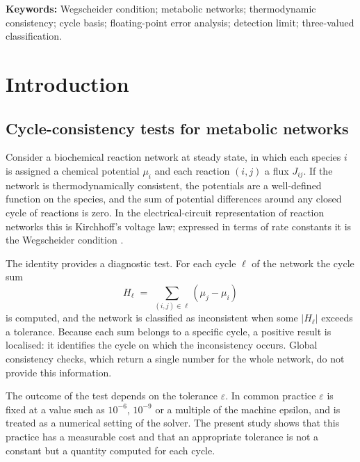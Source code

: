 \documentclass[11pt,a4paper]{article}
\theoremstyle{pstyle}
\theoremstyle{definition}
\theoremstyle{remark}
\newcommand{\abs}[1]{\lvert#1\rvert}
\newcommand{\eps}{\varepsilon}
\newcommand{\hol}{H}
\begin{document}
\noindent\textbf{Keywords:} Wegscheider condition; metabolic networks;
thermodynamic consistency; cycle basis; floating-point error analysis;
detection limit; three-valued classification.


\section{Introduction}
\label{sec:intro}

\subsection{Cycle-consistency tests for metabolic networks}

Consider a biochemical reaction network at steady state, in which each
species $i$ is assigned a chemical potential $\mu_i$ and each reaction
$(i,j)$ a flux $J_{ij}$. If the network is thermodynamically consistent,
the potentials are a well-defined function on the species, and the sum
of potential differences around any closed cycle of reactions is zero.
In the electrical-circuit representation of reaction networks
\citep{oster1971,peusner1986} this is Kirchhoff's voltage law; expressed
in terms of rate constants it is the Wegscheider condition
\citep{wegscheider1901,schuster1989}.

The identity provides a diagnostic test. For each cycle $\ell$ of the
network the cycle sum
\begin{equation}
  \hol_\ell \;=\; \sum_{(i,j)\in\ell} (\mu_j - \mu_i)
  \label{eq:cyclesum-informal}
\end{equation}
is computed, and the network is classified as inconsistent when some
$\abs{\hol_\ell}$ exceeds a tolerance. Because each sum belongs to a
specific cycle, a positive result is localised: it identifies the cycle
on which the inconsistency occurs. Global consistency checks, which
return a single number for the whole network, do not provide this
information.

The outcome of the test depends on the tolerance $\eps$. In common
practice $\eps$ is fixed at a value such as $10^{-6}$, $10^{-9}$ or a
multiple of the machine epsilon, and is treated as a numerical setting
of the solver. The present study shows that this practice has a
measurable cost and that an appropriate tolerance is not a constant but
a quantity computed for each cycle.
\end{document}
